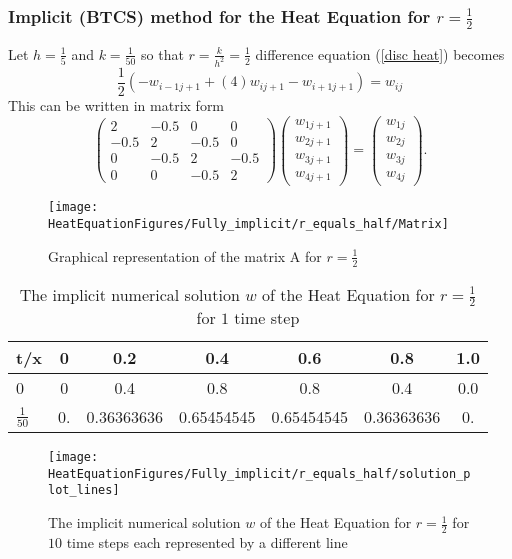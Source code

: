 \begin{example}


\subsubsection{Implicit (BTCS) method for the Heat Equation for $r=\frac{1}{2}$}
Let $h=\frac{1}{5}$ and $k=\frac{1}{50}$ so that $r=\frac{k}{h^2}=\frac{1}{2}$
difference equation (\ref{disc heat}) becomes
\[
\frac{1}{2}(-w_{i-1j+1}+(4)w_{ij+1}-w_{i+1j+1})=w_{ij}
\]
This can be written in matrix form 
\[
\left(\begin{array}{cccc}
2&-0.5&0&0\\
-0.5&2&-0.5&0\\
0&-0.5&2&-0.5\\
0&0&-0.5&2
\end{array}\right)
\left(\begin{array}{c}
w_{1j+1}\\
w_{2j+1}\\
w_{3j+1}\\
w_{4j+1}
\end{array}\right)
=
\left(\begin{array}{c}
w_{1j}\\
w_{2j}\\
w_{3j}\\
w_{4j}
\end{array}\right).
\]
\begin{figure}[H]
  \caption{Graphical representation of the matrix A for $r=\frac{1}{2}$ }
  \centering
    \texttt{[image: HeatEquationFigures/Fully\_implicit/r\_equals\_half/Matrix]}
\end{figure}


\begin{center}
\begin{table}[H]
 \caption{The implicit numerical solution $w$ of the Heat Equation for $r=\frac{1}{2}$ for $1$ time step}
 \centering
\begin{tabular}{l|cccccc}
t/x&0&0.2&0.4&0.6&0.8&1.0\\ \hline
0&0&0.4&0.8&0.8&0.4&0.0\\
$\frac{1}{50}$&0. &         0.36363636 &  0.65454545 & 0.65454545&  0.36363636 & 0.
\end{tabular}
\end{table}
\end{center}

\begin{figure}[H]
  \caption{The implicit numerical solution $w$ of the Heat Equation for $r=\frac{1}{2}$ for $10$ time steps each represented by a different line}
  \centering
    \texttt{[image: HeatEquationFigures/Fully\_implicit/r\_equals\_half/solution\_plot\_lines]}
\end{figure}



\end{example}
